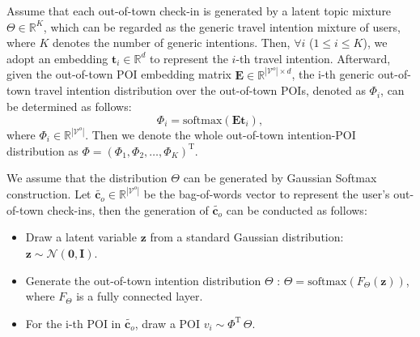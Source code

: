 \documentclass[letterpaper]{article} %
\begin{document}
Assume that each out-of-town check-in is generated by a latent topic mixture $\Theta \in \mathbb{R}^K$, which can be regarded as the generic travel intention mixture of users, where $K$ denotes the number of generic intentions.
Then, $\forall i$ ($1 \leq i \leq K$), we adopt an embedding $\mathbf{t}_i \in \mathbb{R}^d$ to represent the $i$-th travel intention.
Afterward, given the out-of-town POI embedding matrix $\mathbf{E} \in \mathbb{R}^{|\mathcal{V}^o| \times d}$,
the i-th generic out-of-town travel intention distribution over the out-of-town POIs, denoted as $\Phi_i$, can be determined as follows:
\begin{equation}\label{e:phi}
    \Phi_i = \mathrm{softmax}\left(\mathbf{E}\mathbf{t}_i\right)  ,
\end{equation}
where $\Phi_i \in \mathbb{R}^{ |\mathcal{V}^o| }$.
Then we denote the whole out-of-town intention-POI distribution as $\Phi=\left(\Phi_1,\Phi_2,\ldots,\Phi_{K}\right)^\mathrm{T}$.

We assume that the distribution $\Theta$ can be generated by Gaussian Softmax construction.
Let $\widetilde{\mathbf{c}_o} \in \mathbb{R}^{|\mathcal{V}^o|}$ be the bag-of-words vector to represent the user's out-of-town check-ins, then the generation of $\widetilde{\mathbf{c}_o}$ can be conducted as follows:
\begin{itemize}
    \item
    Draw a latent variable $\mathbf{z}$ from a standard Gaussian distribution:
    $\mathbf{z} \sim \mathcal{N}\left(\mathbf{0},\mathbf{I}\right)$.

    \item
    Generate the out-of-town intention distribution $ \Theta $ :
    $\Theta = \mathrm{softmax} \left(F_{\Theta}\left(\mathbf{z}\right)\right)$, where $F_{\Theta}$ is a fully connected layer.

    \item
    For the i-th POI in $\widetilde{\mathbf{c}_o}$, draw a POI $v_i \sim {\Phi}^\mathrm{T} \, \Theta $.
\end{itemize}
\end{document}
